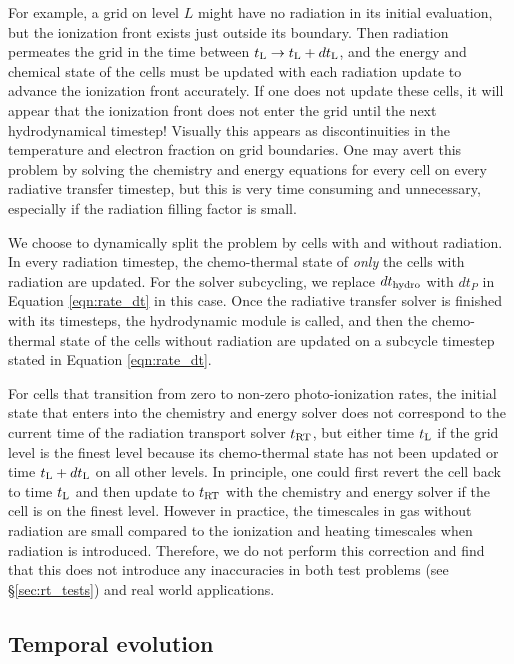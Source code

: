 \documentclass[useAMS,usenatbib,a4paper]{mn2e}
\begin{document}
For example, a grid on level $L$ might have no radiation in its
initial evaluation, but the ionization front exists just outside its
boundary.  Then radiation permeates the grid in the time between
$t_{\rm L} \rightarrow t_{\rm L}+dt_{\rm L}$, and the energy and
chemical state of the cells must be updated with each radiation update
to advance the ionization front accurately.  If one does not update
these cells, it will appear that the ionization front does not enter
the grid until the next hydrodynamical timestep!  Visually this
appears as discontinuities in the temperature and electron fraction on
grid boundaries.  One may avert this problem by solving the chemistry
and energy equations for every cell on every radiative transfer
timestep, but this is very time consuming and unnecessary, especially
if the radiation filling factor is small.

We choose to dynamically split the problem by cells with and without
radiation.  In every radiation timestep, the chemo-thermal state of
\textit{only} the cells with radiation are updated.  For the solver
subcycling, we replace $dt_{\rm hydro}$ with $dt_P$ in Equation
\ref{eqn:rate_dt} in this case.  Once the radiative transfer solver is
finished with its timesteps, the hydrodynamic module is called, and
then the chemo-thermal state of the cells without radiation are
updated on a subcycle timestep stated in Equation \ref{eqn:rate_dt}.

For cells that transition from zero to non-zero photo-ionization
rates, the initial state that enters into the chemistry and energy
solver does not correspond to the current time of the radiation
transport solver $t_{\rm RT}$, but either time $t_{\rm L}$ if the grid
level is the finest level because its chemo-thermal state has not been
updated or time $t_{\rm L}+dt_{\rm L}$ on all other levels.  In
principle, one could first revert the cell back to time $t_{\rm L}$
and then update to $t_{\rm RT}$ with the chemistry and energy solver
if the cell is on the finest level.  However in practice, the
timescales in gas without radiation are small compared to the
ionization and heating timescales when radiation is introduced.
Therefore, we do not perform this correction and find that this does
not introduce any inaccuracies in both test problems (see
\S\ref{sec:rt_tests}) and real world applications.


\subsection{Temporal evolution}
\label{sec:timestepping}
\end{document}
